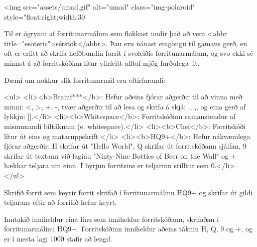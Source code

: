 
<img src="assets/umad.gif" alt="umad" class="img-polaroid" style="float:right;width:30%

Til er ógrynni af forritunarmálum sem flokkast undir það að vera <abbr
title="esoteric">sérstök</abbr>. Þau eru nánast eingöngu til gamans gerð, en
oft er erfitt að skrifa hefðbundin forrit í svoleiðis forritunarmálum, og svo
ekki sé minnst á að forritskóðinn lítur yfirleitt alltaf mjög furðulega út.

Dæmi um nokkur slík forritunarmál eru eftirfarandi:

<ul>
    <li><b>Brainf***</b>: Hefur aðeins fjórar aðgerðir til að vinna með minni:
    <, >, +, -, tvær aðgerðir til að lesa og skrifa á skjá: ., ,, og eina gerð
    af lykkju: [].</li>
    <li><b>Whitespace</b>: Forritskóðinn samanstendur af mismunandi biltáknum (e.
    whitespace).</li>
    <li><b>Chef</b>: Forritskóði lítur út eins og mataruppskrift.</li>
    <li><b>HQ9+</b>: Hefur nákvæmlega fjórar aðgerðir: H skrifar út "Hello World", Q
    skrifar út forritskóðann sjálfan, 9 skrifar út textann við laginu "Ninty-Nine
    Bottles of Beer on the Wall" og + hækkar teljara um einn. Í byrjun
    forritsins er teljarinn stilltur sem 0.</li>
</ul>

Skrifið forrit sem keyrir forrit skrifað í forritunarmálinu HQ9+ og skrifar út
gildi teljarans eftir að forritið hefur keyrt.

Inntakið inniheldur eina línu sem inniheldur forritskóðann, skrifaðan í
forritunarmálinu HQ9+. Forritskóðinn inniheldur aðeins táknin H, Q, 9 og +, og er í
mesta lagi 1000 stafir að lengd.
